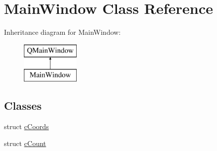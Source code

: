 \hypertarget{class_main_window}{}\section{Main\+Window Class Reference}
\label{class_main_window}
Inheritance diagram for Main\+Window\+:\begin{figure}[H]
\begin{center}
\leavevmode
\includegraphics[height=2.000000cm]{class_main_window}
\end{center}
\end{figure}
\subsection*{Classes}
\begin{DoxyCompactItemize}
\item 
struct \hyperlink{struct_main_window_1_1c_coords}{c\+Coords}
\item 
struct \hyperlink{struct_main_window_1_1c_count}{c\+Count}
\end{DoxyCompactItemize}
